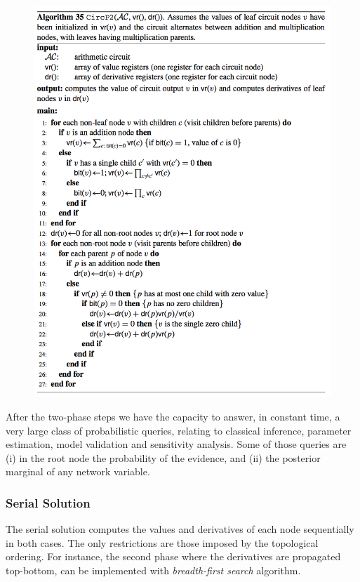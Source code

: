 \documentclass[twoside,11pt]{article}
\begin{document}
\begin{figure}[!htb]
    \begin{center}
    	\includegraphics[width=\columnwidth]{figures/alg.png}
		\label{fig:alg}
    \end{center}
\end{figure}

After the two-phase steps we have the capacity to answer, in constant time, a very large class of probabilistic queries, relating to classical inference, parameter estimation, model validation and sensitivity analysis.
Some of those queries are
(i) in the root node the probability of the evidence, and 
(ii) the posterior marginal of any network variable.

\subsubsection{Serial Solution}

The serial solution computes the values and derivatives of each node sequentially in both cases.
The only restrictions are those imposed by the topological ordering.
For instance, the second phase where the derivatives are propagated top-bottom, can be implemented with \emph{breadth-first search} algorithm.
\end{document}
